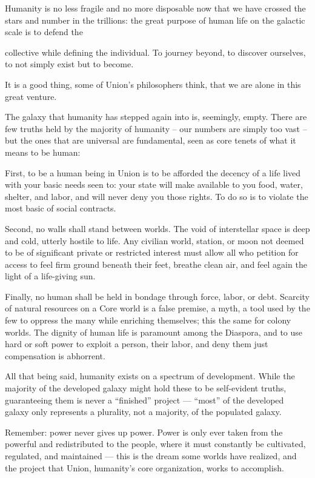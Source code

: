Humanity is no less fragile and no more disposable now that we have crossed the stars and
number in the trillions: the great purpose of human life on the galactic scale is to defend the




collective while defining the individual. To journey beyond, to discover ourselves, to not simply
exist but to become.


It is a good thing, some of Union’s philosophers think, that we are alone in this great venture.


The galaxy that humanity has stepped again into is, seemingly, empty. There are few truths held
by the majority of humanity -- our numbers are simply too vast -- but the ones that are universal
are fundamental, seen as core tenets of what it means to be human:


First, to be a human being in Union is to be afforded the decency of a life lived with your basic
needs seen to: your state will make available to you food, water, shelter, and labor, and will never
deny you those rights. To do so is to violate the most basic of social contracts.


Second, no walls shall stand between worlds. The void of interstellar space is deep and cold,
utterly hostile to life. Any civilian world, station, or moon not deemed to be of significant private
or restricted interest must allow all who petition for access to feel firm ground beneath their feet,
breathe clean air, and feel again the light of a life-giving sun.


Finally, no human shall be held in bondage through force, labor, or debt. Scarcity of natural
resources on a Core world is a false premise, a myth, a tool used by the few to oppress the many
while enriching themselves; this the same for colony worlds. The dignity of human life is
paramount among the Diaspora, and to use hard or soft power to exploit a person, their labor,
and deny them just compensation is abhorrent.


All that being said, humanity exists on a spectrum of development. While the majority of the
developed galaxy might hold these to be self-evident truths, guaranteeing them is never a
“finished” project — “most” of the developed galaxy only represents a plurality, not a majority, of
the populated galaxy.


Remember: power never gives up power. Power is only ever taken from the powerful and
redistributed to the people, where it must constantly be cultivated, regulated, and maintained —
this is the dream some worlds have realized, and the project that Union, humanity’s core
organization, works to accomplish.


